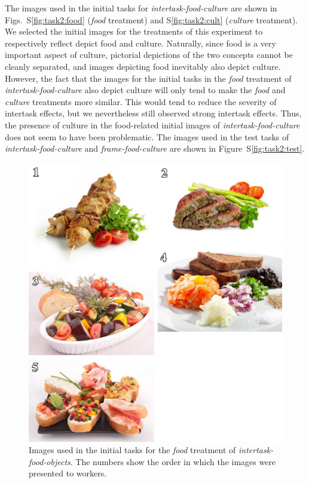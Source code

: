 \documentclass{sigchi}
\begin{document}
The images used in the initial tasks
for \textit{intertask-food-culture} are shown in Figs.~S\ref{fig:task2:food} 
(\textit{food} treatment) and S\ref{fig:task2:cult} 
(\textit{culture} treatment).
We selected the initial images for the treatments of this experiment to 
respectively reflect depict food and culture.
Naturally, since food is a very
important aspect of culture, pictorial depictions of the two concepts 
cannot be cleanly separated,
and images depicting food inevitably also depict culture.
However, the fact that the images for the initial tasks in the 
\textit{food} treatment 
of \textit{intertask-food-culture} also depict culture
will only tend to make the \textit{food} and \textit{culture}
treatments more similar. 
This would tend to reduce the severity of intertask 
effects, but we nevertheless still observed strong intertask effects.
Thus, the presence of culture in the food-related initial images of 
\textit{intertask-food-culture} does not seem to have been problematic.
The images used in the test tasks of \textit{intertask-food-culture} and
\textit{frame-food-culture} are shown in Figure~S\ref{fig:task2:test}.

\begin{figure}
	\begin{center}
	\includegraphics{figs/task1-food.jpg}
	\end{center}
	\caption{
		Images used in the initial tasks for the
		\textit{food} treatment of \textit{intertask-food-objects}.  
		The numbers show the order in which the 
		images were presented to workers.
	}
	\label{fig:task1:food}
\end{figure}
\end{document}

